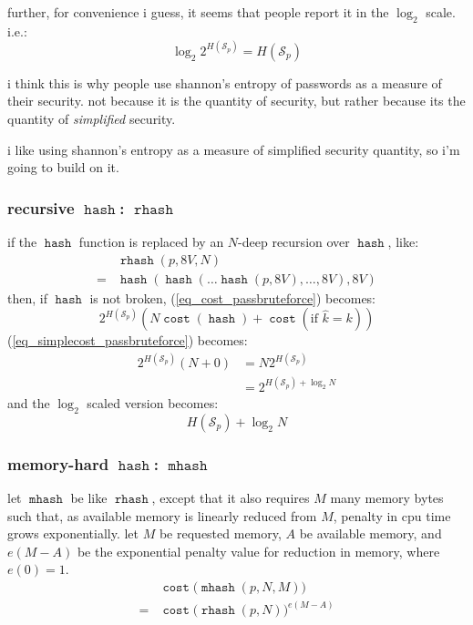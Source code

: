 \documentclass[twocolumn]{article}
\DeclareMathOperator{\hash}{\mathtt{hash}}
\DeclareMathOperator{\rhash}{\mathtt{rhash}}
\DeclareMathOperator{\mhash}{\mathtt{mhash}}
\DeclareMathOperator{\cost}{\mathtt{cost}}
\begin{document}
further, for convenience i guess, it seems that people report it in the
$\log_2$ scale.  i.e.:
\begin{equation}\label{eq_pass_entropy}
    \log_2 2^{H(\mathcal{S}_p)} = H(\mathcal{S}_p)
\end{equation}

i think this is why people use shannon's entropy of passwords as a measure
of their security.  not because it is the quantity of security, but rather
because its the quantity of \emph{simplified} security.

i like using shannon's entropy as a measure of simplified security
quantity, so i'm going to build on it.

\subsubsection{recursive $\hash$: $\rhash$}
if the $\hash$ function is replaced by an $N$-deep recursion over $\hash$,
like:
\[
    \begin{split}
        & \rhash(p, 8V, N) \\
    ={} &  \hash(\hash(\ldots\hash(p, 8V), \ldots, 8V), 8V)
    \end{split}
\]
then, if $\hash$ is not broken,  (\ref{eq_cost_passbruteforce}) becomes:
\begin{equation}\label{eq_cost_passbruteforce_N}
    2^{H(\mathcal{S}_p)} \left(
        N\cost(\hash) + \cost(\text{if } \hat k = k)
    \right)
\end{equation}
(\ref{eq_simplecost_passbruteforce}) becomes:
\begin{equation}\label{eq_simplecost_passbruteforce_N}
    \begin{split}
    2^{H(\mathcal{S}_p)} (N+0) &= N2^{H(\mathcal{S}_p)} \\
                  &= 2^{H(\mathcal{S}_p) + \log_2 N}
    \end{split}
\end{equation}
and the $\log_2$ scaled version becomes:
\begin{equation}\label{eq_pass_cavemanentropy_rhash}
    H(\mathcal{S}_p) + \log_2 N
\end{equation}

\subsubsection{memory-hard $\hash$: $\mhash$}
let $\mhash$ be like $\rhash$, except that it also requires $M$ many memory
bytes such that, as available memory is linearly reduced from $M$, penalty
in cpu time grows exponentially.  let $M$ be requested memory, $A$ be
available memory, and $e(M - A)$ be the exponential penalty value for
reduction in memory, where $e(0) = 1$.
\begin{equation}
    \begin{split}
        & \cost\Big(\mhash(p, N, M)\Big) \\
    ={} & \cost\Big(\rhash(p, N)\Big)^{e(M-A)}
    \end{split}
\end{equation}
\end{document}
